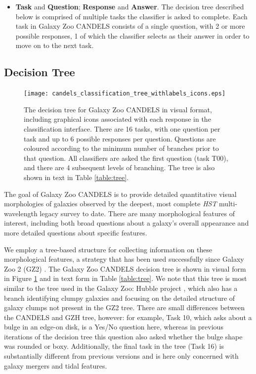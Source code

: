 \documentclass[useAMS,usenatbib]{mn2e}
\begin{document}
{\begin{itemize}
\item \textbf{Task} and \textbf{Question}; \textbf{Response} and \textbf{Answer}. The decision tree described below is comprised of multiple tasks the classifier is asked to complete. Each task in Galaxy Zoo CANDELS consists of a single question, with 2 or more possible responses, 1 of which the classifier selects as their answer in order to move on to the next task.

\end{itemize}



\subsection{Decision Tree}\label{sec:tree}

\begin{figure}
\texttt{[image: candels\_classification\_tree\_withlabels\_icons.eps]}
\caption{
The decision tree for Galaxy Zoo CANDELS in visual format, including graphical icons associated with each response in the classification interface. There are 16 tasks, with one question per task and up to 6 possible responses per question. Questions are coloured according to the minimum number of branches prior to that question. All classifiers are asked the first question (task T00), and there are 4 subsequent levels of branching. The tree is also shown in text in Table \ref{table:tree}.
}
\label{fig:tree}
\end{figure}

The goal of Galaxy Zoo CANDELS is to provide detailed quantitative visual morphologies of galaxies observed by the deepest, most complete \emph{HST} multi-wavelength legacy survey to date. 
There are many morphological features of interest, including both broad questions about a galaxy's overall appearance and more detailed questions about specific features. 

We employ a tree-based structure for collecting information on these morphological features, a strategy that has been used successfully since Galaxy Zoo 2 (GZ2) \citep{willett2014}. The Galaxy Zoo CANDELS decision tree is shown in visual form in Figure \ref{fig:tree} and in text form in Table \ref{table:tree}. We note that this tree is most similar to the tree used in the Galaxy Zoo: Hubble project \citep[described in][]{melvin14,willetinprep}, which also has a branch identifying clumpy galaxies and focusing on the detailed structure of galaxy clumps not present in the GZ2 tree. There are small differences between the CANDELS and GZH tree, however: for example, Task 10, which asks about a bulge in an edge-on disk, is a Yes/No question here, whereas in previous iterations of the decision tree this question also asked whether the bulge shape was rounded or boxy. Additionally, the final task in the tree (Task 16) is substantially different from previous versions and is here only concerned with galaxy mergers and tidal features. 

}
\end{document}
